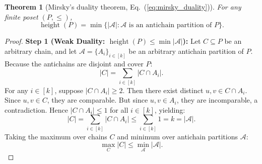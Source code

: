 \documentclass[11pt, letterpaper]{article}
\newtheorem{theorem}{Theorem}[section]
\begin{document}
\begin{theorem}[Mirsky's duality theorem, Eq.~(\ref{eq:mirsky_duality})]
For any finite poset $(P, \le)$,
\begin{equation}
    \operatorname{height}(P) = \min \{|\mathcal{A}| : \mathcal{A} \text{ is an antichain partition of } P\}.
\end{equation}
\end{theorem}

\begin{proof}
\medskip\noindent\textbf{Step 1 (Weak Duality: $\operatorname{height}(P) \le \min |\mathcal{A}|$):}
Let $C \subseteq P$ be an arbitrary chain, and let $\mathcal{A} = \{A_i\}_{i \in [k]}$ be an arbitrary antichain partition of $P$. 
Because the antichains are disjoint and cover $P$:
\begin{equation}
    |C| = \sum_{i \in [k]} |C \cap A_i|.
\end{equation}
For any $i \in [k]$, suppose $|C \cap A_i| \ge 2$. Then there exist distinct $u, v \in C \cap A_i$. Since $u, v \in C$, they are comparable. But since $u, v \in A_i$, they are incomparable, a contradiction. Hence $|C \cap A_i| \le 1$ for all $i \in [k]$, yielding:
\begin{equation}
    |C| = \sum_{i \in [k]} |C \cap A_i| \le \sum_{i \in [k]} 1 = k = |\mathcal{A}|.
\end{equation}
Taking the maximum over chains $C$ and minimum over antichain partitions $\mathcal{A}$:
\begin{equation}
    \max_C |C| \le \min_{\mathcal{A}} |\mathcal{A}|.
\end{equation}


\end{proof}
\end{document}
